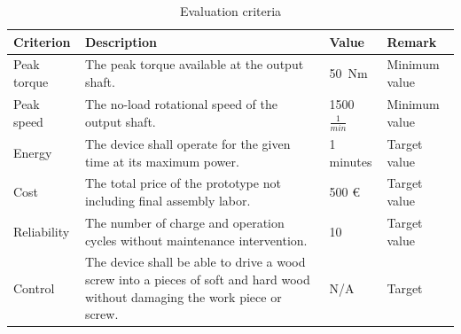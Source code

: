 \documentclass[headinclude=true]{scrartcl}
\begin{document}
\begin{table}
\caption{Evaluation criteria}
\label{tab:evaluation}
 \begin{tabulary}{\linewidth}{lLll}
 \toprule
 Criterion & Description & Value & Remark \\ \midrule
 Peak torque & The peak torque available at the output shaft. & 50~Nm & Minimum value \\
 Peak speed & The no-load rotational speed of the output shaft. & 1500 $\frac{1}{min}$ & Minimum value \\
 Energy & The device shall operate for the given time at its maximum power. & 1 minutes & Target value \\
 Cost & The total price of the prototype not including final assembly labor. & 500 \euro & Target value \\
 Reliability & The number of charge and operation cycles without maintenance intervention. & 10 & Target value \\
 Control & The device shall be able to drive a wood screw into a pieces of soft and hard wood without damaging the work piece or screw. & N/A & Target \\ \bottomrule
 
 
  
 \end{tabulary}
\end{table}








\printbibliography

\appendix
\end{document}
